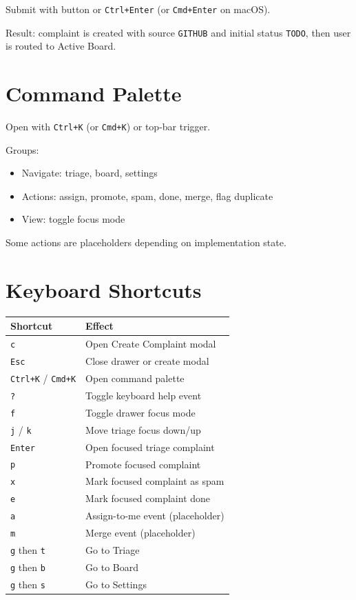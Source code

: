 \documentclass[11pt,a4paper]{article}
\begin{document}
Submit with button or \texttt{Ctrl+Enter} (or \texttt{Cmd+Enter} on macOS).

Result: complaint is created with source \texttt{GITHUB} and initial status \texttt{TODO}, then user is routed to Active Board.

\section{Command Palette}
Open with \texttt{Ctrl+K} (or \texttt{Cmd+K}) or top-bar trigger.

Groups:
\begin{itemize}
  \item Navigate: triage, board, settings
  \item Actions: assign, promote, spam, done, merge, flag duplicate
  \item View: toggle focus mode
\end{itemize}

Some actions are placeholders depending on implementation state.

\section{Keyboard Shortcuts}
\begin{longtable}{>{\raggedright\arraybackslash}p{} >{\raggedright\arraybackslash}p{}}
\textbf{Shortcut} & \textbf{Effect} \\
\hline
\texttt{c} & Open Create Complaint modal \\
\texttt{Esc} & Close drawer or create modal \\
\texttt{Ctrl+K} / \texttt{Cmd+K} & Open command palette \\
\texttt{?} & Toggle keyboard help event \\
\texttt{f} & Toggle drawer focus mode \\
\texttt{j} / \texttt{k} & Move triage focus down/up \\
\texttt{Enter} & Open focused triage complaint \\
\texttt{p} & Promote focused complaint \\
\texttt{x} & Mark focused complaint as spam \\
\texttt{e} & Mark focused complaint done \\
\texttt{a} & Assign-to-me event (placeholder) \\
\texttt{m} & Merge event (placeholder) \\
\texttt{g} then \texttt{t} & Go to Triage \\
\texttt{g} then \texttt{b} & Go to Board \\
\texttt{g} then \texttt{s} & Go to Settings \\
\end{longtable}
\end{document}
